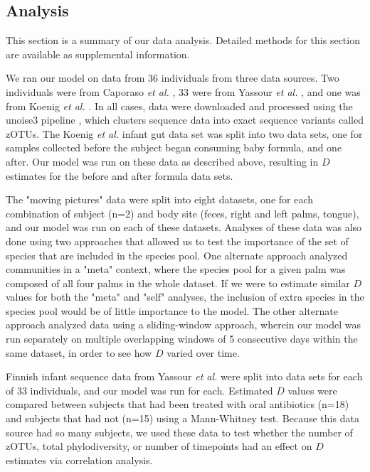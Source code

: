 \documentclass{article}
\begin{document}
\subsection{Analysis} \label{sec:analysis}
This section is a summary of our data analysis. Detailed methods for this section are available as supplemental information.
\par
We ran our model on data from 36 individuals from three data sources. Two individuals were from Caporaso \emph{et al.} \cite{Caporaso2011}, 33 were from Yassour \emph{et al.} \cite{Yassour2016}, and one was from Koenig \emph{et al.} \cite{Koenig2011}. In all cases, data were downloaded and processed using the unoise3 pipeline \cite{Edgar2016}, which clusters sequence data into exact sequence variants called zOTUs. The Koenig \emph{et al.} infant gut data set was split into two data sets, one for samples collected before the subject began consuming baby formula, and one after. Our model was run on these data as described above, resulting in \(D\) estimates for the before and after formula data sets. 
\par
The "moving pictures" \cite{Caporaso2011} data were split into eight datasets, one for each combination of subject (n=2) and body site (feces, right and left palms, tongue), and our model was run on each of these datasets. Analyses of these data was also done using two approaches that allowed us to test the importance of the set of species that are included in the species pool. One alternate approach analyzed communities in a "meta" context, where the species pool for a given palm was composed of all four palms in the whole dataset. If we were to estimate similar \(D\) values for both the "meta" and "self" analyses, the inclusion of extra species in the species pool would be of little importance to the model. The other alternate approach analyzed data using a sliding-window approach, wherein our model was run separately on multiple overlapping windows of 5 consecutive days within the same dataset, in order to see how \(D\) varied over time. 
\par
Finnish infant sequence data from Yassour \emph{et al.} \cite{Yassour2016} were split into data sets for each of 33 individuals, and our model was run for each. Estimated \(D\) values were compared between subjects that had been treated with oral antibiotics (n=18) and subjects that had not (n=15) using a Mann-Whitney test. Because this data source had so many subjects, we used these data to test whether the number of zOTUs, total phylodiversity, or number of timepoints had an effect on \(D\) estimates via correlation analysis. 
\end{document}
